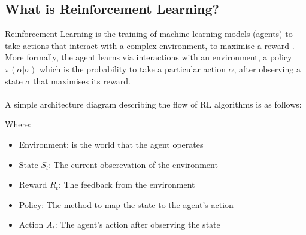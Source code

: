 \documentclass[ %
                    author={Ashwinder Khurana},
                supervisor={Prof Dave Cliff},
                    degree={MEng},
                     title={The Deeply Reinforced Trader},
                  subtitle={},
                      type={enterprise},
                      year={2020} ]{dissertation}
\begin{document}
\subsection{What is Reinforcement Learning?}
\label{subsection:What is Reinforcement Learning?}
Reinforcement Learning is the training of machine learning models (agents) to take actions that interact with a complex environment, to maximise a reward \cite{what-is-RL}. More formally, the agent learns via interactions with an environment, a policy $\pi(\alpha|\sigma)$ which is the probability to take a particular action $\alpha$, after observing a state $\sigma$ that maximises its reward. 
\\
\\
\noindent
A simple architecture diagram describing the flow of RL algorithms is as follows:
\begin{figure}[H]
\label{fig:RL-arch}  
\end{figure}

\noindent
Where:
\begin{itemize}
\item Environment: is the world that the agent operates 
\item State $S_t$: The current obserevation of the environment
\item Reward $R_t$: The feedback from the environment
\item Policy: The method to map the state to the agent's action 
\item Action $A_t$: The agent's action after observing the state
\end{itemize}

\vspace{0.5cm}
\end{document}

